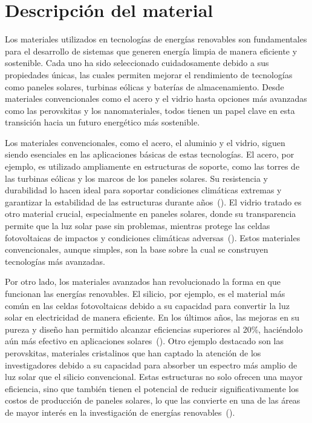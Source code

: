\documentclass[letterpaper, 12pt]{article}
\begin{document}
\section{Descripción del material}

Los materiales utilizados en tecnologías de energías renovables son
fundamentales para el desarrollo de sistemas que generen energía limpia de
manera eficiente y sostenible. Cada uno ha sido seleccionado cuidadosamente
debido a sus propiedades únicas, las cuales permiten mejorar el rendimiento de
tecnologías como paneles solares, turbinas eólicas y baterías de
almacenamiento. Desde materiales convencionales como el acero y el vidrio hasta
opciones más avanzadas como las perovskitas y los nanomateriales, todos tienen
un papel clave en esta transición hacia un futuro energético más sostenible.

Los materiales convencionales, como el acero, el aluminio y el vidrio, siguen
siendo esenciales en las aplicaciones básicas de estas tecnologías. El acero,
por ejemplo, es utilizado ampliamente en estructuras de soporte, como las
torres de las turbinas eólicas y los marcos de los paneles solares. Su
resistencia y durabilidad lo hacen ideal para soportar condiciones climáticas
extremas y garantizar la estabilidad de las estructuras durante
años~(\cite{Ebhota_Jen2019}). El vidrio tratado es otro material crucial,
especialmente en paneles solares, donde su transparencia permite que la luz
solar pase sin problemas, mientras protege las celdas fotovoltaicas de impactos
y condiciones climáticas adversas~(\cite{Galembeck2019}). Estos materiales
convencionales, aunque simples, son la base sobre la cual se construyen
tecnologías más avanzadas.

Por otro lado, los materiales avanzados han revolucionado la forma en que
funcionan las energías renovables. El silicio, por ejemplo, es el material más
común en las celdas fotovoltaicas debido a su capacidad para convertir la luz
solar en electricidad de manera eficiente. En los últimos años, las mejoras en
su pureza y diseño han permitido alcanzar eficiencias superiores al 20\%,
haciéndolo aún más efectivo en aplicaciones solares~(\cite{Henriksson2021}).
Otro ejemplo destacado son las perovskitas, materiales cristalinos que han
captado la atención de los investigadores debido a su capacidad para absorber
un espectro más amplio de luz solar que el silicio convencional. Estas
estructuras no solo ofrecen una mayor eficiencia, sino que también tienen el
potencial de reducir significativamente los costos de producción de paneles
solares, lo que las convierte en una de las áreas de mayor interés en la
investigación de energías renovables~(\cite{Ebhota_Jen2019}).
\end{document}
